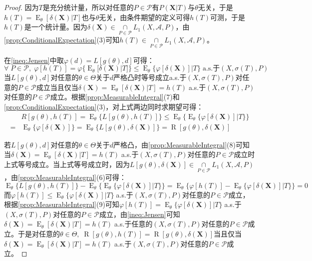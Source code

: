 \begin{proof}
	因为$T$是充分统计量，所以对任意的$P\in\mathscr{P}$有$P(\mathbf{X}|T)$与$\theta$无关，于是$h(T)=\operatorname{E}_{\theta}[\delta(\mathbf{X})|T]$也与$\theta$无关，由条件期望的定义可得$h(T)$可测，于是$h(T)$是一个统计量。因为$\delta(\mathbf{X})\in\underset{P\in\mathscr{P}}{\cap}L_1(X,\mathscr{A},P)$，由\cref{prop:ConditionalExpectation}(3)可知$h(T)\in\underset{P\in\mathscr{P}}{\cap}L_1(X,\mathscr{A},P)$。\par
	在\cref{ineq:Jensen}中取$\varphi(d)=L[g(\theta),d]$可得：
	\begin{equation*}
		\forall\;P\in\mathscr{P},\;\varphi[h(T)]=\varphi\{\operatorname{E}_{\theta}[\delta(\mathbf{X})|T]\}\leqslant\operatorname{E}_{\theta}\{\varphi[\delta(\mathbf{X})]|T\}\;\text{a.s.于}(X,\sigma(T),P)
	\end{equation*}
	当$L[g(\theta),d]$对任意的$\theta\in\Theta$关于$d$严格凸时等号成立a.s.于$(X,\sigma(T),P)$对任意的$P\in\mathscr{P}$成立当且仅当$\delta(\mathbf{X})=\operatorname{E}_{\theta}[\delta(\mathbf{X})|T]=h(T)\;$a.s.于$(X,\sigma(T),P)$对任意的$P\in\mathscr{P}$成立。根据\cref{prop:MeasurableIntegral}(7)和\cref{prop:ConditionalExpectation}(3)，对上式两边同时求期望可得：
	\begin{align*}
		&R[g(\theta),h(T)]=\operatorname{E}_{\theta}\{L[g(\theta),h(T)]\}\leqslant\operatorname{E}_{\theta}\Big\{\operatorname{E}_{\theta}\{\varphi[\delta(\mathbf{X})]|T\}\Big\} \\
		=&\operatorname{E}_{\theta}\{\varphi[\delta(\mathbf{X})]\}=\operatorname{E}_{\theta}\{L[g(\theta),\delta(\mathbf{X})]\}=\operatorname{R}[g(\theta),\delta(\mathbf{X})]
	\end{align*}\par
	若$L[g(\theta),d]$对任意的$\theta\in\Theta$关于$d$严格凸，由\cref{prop:MeasurableIntegral}(8)可知当$\delta(\mathbf{X})=\operatorname{E}_{\theta}[\delta(\mathbf{X})|T]=h(T)\;$a.s.于$(X,\sigma(T),P)$对任意的$P\in\mathscr{P}$成立时上式等号成立。当上式等号成立时，因为$L[g(\theta),\delta(\mathbf{X})]\in\underset{P\in\mathscr{P}}{\cap}L_1(X,\mathscr{A},P)$，由\cref{prop:MeasurableIntegral}(6)可得：
	\begin{equation*}
		\operatorname{E}_{\theta}\{L[g(\theta),h(T)]\}-\operatorname{E}_{\theta}\Big\{\operatorname{E}_{\theta}\{\varphi[\delta(\mathbf{X})]|T\}\Big\}=\operatorname{E}_{\theta}\Big\{\varphi[h(T)]-\operatorname{E}_{\theta}\{\varphi[\delta(\mathbf{X})]|T\}\Big\}=0
	\end{equation*}
	而$\varphi[h(T)]\leqslant\operatorname{E}_{\theta}\{\varphi[\delta(\mathbf{X})]|T\}\;$a.s.于$(X,\sigma(T),P)$对任意的$P\in\mathscr{P}$成立，根据\cref{prop:MeasurableIntegral}(9)可知$\varphi[h(T)]=\operatorname{E}_{\theta}\{\varphi[\delta(\mathbf{X})]|T\}\;$a.s.于$(X,\sigma(T),P)$对任意的$P\in\mathscr{P}$成立，由\cref{ineq:Jensen}可知$\delta(\mathbf{X})=\operatorname{E}_{\theta}[\delta(\mathbf{X})|T]=h(T)\;$a.s.于任意的$(X,\sigma(T),P)$对任意的$P\in\mathscr{P}$成立。于是对任意的$\theta\in\Theta,\;\operatorname{R}[g(\theta),h(T)]=\operatorname{R}[g(\theta),\delta(\mathbf{X})]$当且仅当$\delta(\mathbf{X})=\operatorname{E}_{\theta}[\delta(\mathbf{X})|T]=h(T)\;$a.s.于$(X,\sigma(T),P)$对任意的$P\in\mathscr{P}$成立。\par

\end{proof}
